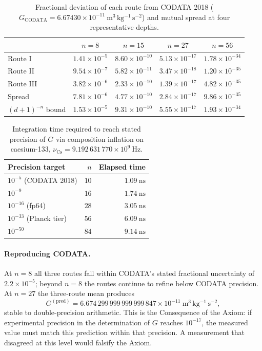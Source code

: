 \begin{table}[H]
\centering\small
\caption{Fractional deviation of each route from CODATA 2018
($G_{\mathrm{CODATA}} = 6.67430\times10^{-11}~\mathrm{m^{3}\,kg^{-1}\,s^{-2}}$)
and mutual spread at four representative depths.}
\label{tab:routedeviation}
\begin{tabular}{lcccc}
\toprule
 & $n=8$ & $n=15$ & $n=27$ & $n=56$\\
\midrule
Route I   & $1.41\times10^{-5}$  & $8.60\times10^{-10}$ & $5.13\times10^{-17}$ & $1.78\times10^{-34}$\\
Route II  & $9.54\times10^{-7}$  & $5.82\times10^{-11}$ & $3.47\times10^{-18}$ & $1.20\times10^{-35}$\\
Route III & $3.82\times10^{-6}$  & $2.33\times10^{-10}$ & $1.39\times10^{-17}$ & $4.82\times10^{-35}$\\
\midrule
Spread    & $7.81\times10^{-6}$  & $4.77\times10^{-10}$ & $2.84\times10^{-17}$ & $9.86\times10^{-35}$\\
$(d{+}1)^{-n}$ bound & $1.53\times10^{-5}$ & $9.31\times10^{-10}$ & $5.55\times10^{-17}$ & $1.93\times10^{-34}$\\
\bottomrule
\end{tabular}
\end{table}

\begin{table}[H]
\centering\small
\caption{Integration time required to reach stated precision of $G$ via
composition inflation on caesium-133,
$\nu_{\mathrm{Cs}} = 9.192\,631\,770\times10^{9}~\mathrm{Hz}$.}
\label{tab:integrationtime}
\begin{tabular}{lrr}
\toprule
Precision target & $n$ & Elapsed time\\
\midrule
$10^{-5}$ (CODATA 2018)  & $10$ & $1.09~\mathrm{ns}$\\
$10^{-9}$                & $16$ & $1.74~\mathrm{ns}$\\
$10^{-16}$ (fp64)        & $28$ & $3.05~\mathrm{ns}$\\
$10^{-33}$ (Planck tier) & $56$ & $6.09~\mathrm{ns}$\\
$10^{-50}$               & $84$ & $9.14~\mathrm{ns}$\\
\bottomrule
\end{tabular}
\end{table}

\paragraph{Reproducing CODATA.}
At $n = 8$ all three routes fall within CODATA's stated fractional uncertainty
of $2.2\times10^{-5}$; beyond $n = 8$ the routes continue to refine below
CODATA precision.
At $n = 27$ the three-route mean produces
\begin{equation}
  G^{(\mathrm{pred})} = 6.674\,299\,999\,999\,999\,847\times10^{-11}
                         ~\mathrm{m^{3}\,kg^{-1}\,s^{-2}},
\end{equation}
stable to double-precision arithmetic.
This is the Consequence of the Axiom: if experimental precision in the
determination of $G$ reaches $10^{-17}$, the measured value must match this
prediction within that precision.
A measurement that disagreed at this level would falsify the Axiom.

